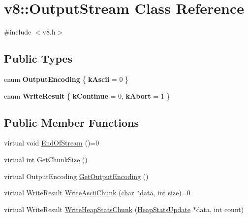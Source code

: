 \hypertarget{classv8_1_1_output_stream}{}\section{v8\+:\+:Output\+Stream Class Reference}
\label{classv8_1_1_output_stream}


{\ttfamily \#include $<$v8.\+h$>$}

\subsection*{Public Types}
\begin{DoxyCompactItemize}
\item 
\hypertarget{classv8_1_1_output_stream_a73e16718962e5c852c9341aed01c96cd}{}enum {\bfseries Output\+Encoding} \{ {\bfseries k\+Ascii} = 0
 \}\label{classv8_1_1_output_stream_a73e16718962e5c852c9341aed01c96cd}

\item 
\hypertarget{classv8_1_1_output_stream_a336c7605a0ce4fbe6f6fca3b03bc16de}{}enum {\bfseries Write\+Result} \{ {\bfseries k\+Continue} = 0, 
{\bfseries k\+Abort} = 1
 \}\label{classv8_1_1_output_stream_a336c7605a0ce4fbe6f6fca3b03bc16de}

\end{DoxyCompactItemize}
\subsection*{Public Member Functions}
\begin{DoxyCompactItemize}
\item 
virtual void \hyperlink{classv8_1_1_output_stream_a6c5c308367fc5776bcbedff0e94d6049}{End\+Of\+Stream} ()=0
\item 
virtual int \hyperlink{classv8_1_1_output_stream_a93bdaa790cbd66a7283fad2cca3f48f7}{Get\+Chunk\+Size} ()
\item 
virtual Output\+Encoding \hyperlink{classv8_1_1_output_stream_ae64c7719c109c5a7404caf4f311dc32d}{Get\+Output\+Encoding} ()
\item 
virtual Write\+Result \hyperlink{classv8_1_1_output_stream_a42adc62ebe43d00159f80328538f217f}{Write\+Ascii\+Chunk} (char $\ast$data, int size)=0
\item 
virtual Write\+Result \hyperlink{classv8_1_1_output_stream_a104fd1a0b5ef685e1d4967aaacbb9e9d}{Write\+Heap\+Stats\+Chunk} (\hyperlink{structv8_1_1_heap_stats_update}{Heap\+Stats\+Update} $\ast$data, int count)
\end{DoxyCompactItemize}


